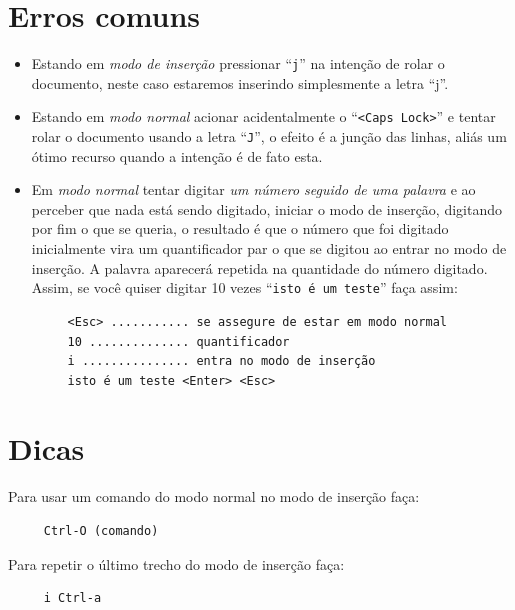 \documentclass[10pt,a4paper,openany]{book}
\begin{document}
\section{Erros comuns}\label{sec:Erros comuns}

\begin{itemize}

\item Estando em {\em{modo de inserção}} pressionar ``\verb+j+'' na intenção
de rolar o documento, neste caso estaremos inserindo simplesmente a letra ``j''. 

\item Estando em {\em{modo normal}} acionar acidentalmente o ``\verb+<Caps Lock>+'' 
e tentar rolar o documento usando a letra ``\verb+J+'', o efeito é a
junção das linhas, aliás um ótimo recurso quando a intenção é de fato esta.

\item Em {\em{modo normal}} tentar digitar {\em{um número seguido de uma palavra}} e ao perceber que 
nada está sendo digitado, iniciar o modo de inserção, digitando por fim o que se queria, 
o resultado é que o número que foi digitado inicialmente vira um quantificador par o que 
se digitou ao entrar no modo de inserção. A palavra aparecerá repetida na quantidade do 
número digitado. Assim, se você quiser digitar 10 vezes ``\verb+isto é um teste+''
 faça assim:

\begin{verbatim}
     <Esc> ........... se assegure de estar em modo normal
     10 .............. quantificador
     i ............... entra no modo de inserção
     isto é um teste <Enter> <Esc>  
\end{verbatim}

\end{itemize}


\section{Dicas}
\label{Dicas}
Para usar um comando do modo normal no modo de inserção faça:

\begin{verbatim}
     Ctrl-O (comando)
\end{verbatim}

Para repetir o último trecho do modo de inserção faça:

\begin{verbatim}
     i Ctrl-a
\end{verbatim}
\end{document}
